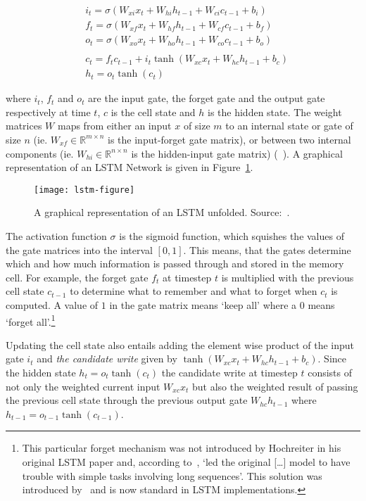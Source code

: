 \begin{align*}
    & i_{t} = \sigma(W_{xi}x_{t} + W_{hi}h_{t-1} + W_{ci}c_{t-1} + b_{i})    \\
    & f_{t} = \sigma(W_{xf}x_{t} + W_{hf}h_{t-1} + W_{cf}c_{t-1} + b_{f})    \\
    & o_{t} = \sigma(W_{xo}x_{t} + W_{ho}h_{t-1} + W_{co}c_{t-1} + b_{o})    \\ \\
    & c_{t} = f_{t}c_{t-1} + i_{t}\tanh(W_{xc}x_{t} + W_{hc}h_{t-1} + b_{c}) \\
    & h_{t} = o_{t}\tanh(c_{t})
\end{align*}

where $i_{t}$, $f_{t}$ and $o_{t}$ are the input gate, the forget gate and the
output gate respectively at time $t$, $c$ is the cell state and $h$ is the
hidden state. The weight matrices $W$ maps from either an input $x$ of size $m$
to an internal state or gate of size $n$ (ie. $W_{xf} \in \mathbb{R}^{m \times
n}$ is the input-forget gate matrix), or between two internal components (ie.
$W_{hi} \in \mathbb{R}^{n \times n}$ is the hidden-input gate matrix)
(~\cite{huang2015bidirectional}). A graphical representation of an LSTM Network
is given in Figure~\ref{fig:lstm}.

\begin{figure}[h]
    \texttt{[image: lstm-figure]}
    \caption{A graphical representation of an LSTM unfolded. Source:~\cite{olah2015lstm}.
    }\label{fig:lstm}
\end{figure}

The activation function $\sigma$ is the sigmoid function, which squishes the
values of the gate matrices into the interval $[0,1]$. This means, that the
gates determine which and how much information is passed through and stored in
the memory cell. For example, the forget gate $f_{t}$ at timestep $t$ is
multiplied with the previous cell state $c_{t-1}$ to determine what to remember
and what to forget when $c_{t}$ is computed. A value of $1$ in the gate matrix
means `keep all' where a $0$ means `forget all'.\footnote{This particular forget
    mechanism was not introduced by Hochreiter in his original LSTM paper and,
    according to~\cite{pitis2016lstm}, `led the original [\ldots] model to have
    trouble with simple tasks involving long sequences'. This solution was
    introduced by~\cite{gers1999learning} and is now standard in LSTM
implementations.}

Updating the cell state also entails adding the element wise product of the
input gate $i_{t}$ and \textit{the candidate write} given by $\tanh(W_{xc}x_{t}
+ W_{hc}h_{t-1} + b_{c})$. Since the hidden state $h_{t} = o_{t}\tanh(c_{t})$
the candidate write at timestep $t$ consists of not only the weighted current
input $W_{xc}x_{t}$ but also the weighted result of passing the previous cell
state through the previous output gate $W_{hc}h_{t-1}$ where $h_{t-1} =
o_{t-1}\tanh(c_{t-1})$.

